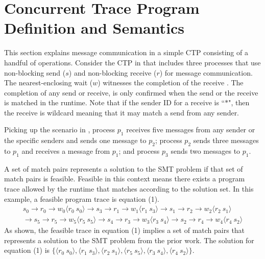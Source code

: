 \section{Concurrent Trace Program Definition and Semantics}

\examplefigone

This section explains message communication in a simple CTP consisting of a handful of operations. Consider the CTP in  that includes three processes that use non-blocking send ($s$) and non-blocking receive ($r$) for message communication. The nearest-enclosing wait ($w$) witnesses the completion of the receive \cite{DBLP:conf/kbse/HuangMM13}. The completion of any send or receive, is only confirmed when the send or the receive is matched in the runtime. Note that if the sender ID for a receive is ``$\ast$", then the receive is wildcard meaning that it may match a send from any sender. 

Picking up the scenario in , process $p_1$ receives five messages from any sender or the specific senders and sends one message to $p_2$; process $p_2$ sends three messages to $p_1$ and receives a message from $p_1$; and process $p_3$ sends two messages to $p_1$. 


A set of match pairs represents a solution to the SMT problem if that set of match pairs is feasible. 
Feasible in this context means there exists a program trace allowed by the runtime that matches according to the solution set. In this example, a feasible program trace is equation (1). 
\begin{equation}
\begin{split}
s_0\rightarrow r_0\rightarrow w_0\langle r_0\ s_0\rangle \rightarrow s_3\rightarrow r_1\rightarrow w_1\langle r_1\ s_3\rangle \rightarrow s_1\rightarrow r_2\rightarrow w_2\langle r_2\ s_1\rangle \\
\rightarrow s_5\rightarrow r_5\rightarrow w_5\langle r_5\ s_5\rangle \rightarrow s_4\rightarrow r_3\rightarrow w_3\langle r_3\ s_4\rangle \rightarrow s_2\rightarrow r_4\rightarrow w_4\langle r_4\ s_2\rangle
\end{split}
\end{equation} 
As shown, the feasible trace in equation (1) implies a set of match pairs that represents a solution to the SMT problem from the prior work. The solution for equation (1) is $\{\langle r_0\ s_0\rangle, \langle r_1\ s_3\rangle, \langle r_2\ s_1\rangle, \langle r_5\ s_5\rangle, \langle r_3\ s_4\rangle, \langle r_4\ s_2\rangle\}$.


